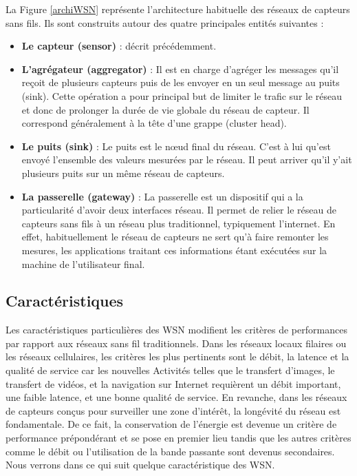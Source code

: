 La  Figure \ref{archiWSN} représente l’architecture habituelle des réseaux de capteurs sans fils. Ils sont construits autour des quatre principales entités suivantes :

\begin{itemize}

\item \textbf{Le capteur (sensor)} : décrit précédemment.

\item \textbf{L’agrégateur (aggregator)} : Il est en charge d’agréger les messages qu’il reçoit de plusieurs capteurs puis de les envoyer en un seul message au puits (sink). Cette opération a pour principal but de limiter le trafic sur le réseau et donc de prolonger la durée de vie globale du réseau de capteur. Il correspond généralement à la tête d’une grappe (cluster head).

\item \textbf{Le puits (sink)} : Le puits est le nœud final  du réseau. C’est à lui qu’est  envoyé l’ensemble des valeurs mesurées par le réseau.  Il peut arriver qu’il y’ait plusieurs puits sur un  même réseau de capteurs.

\item \textbf{La passerelle (gateway)} : La passerelle est un dispositif qui a la particularité d’avoir deux interfaces réseau. Il permet de relier le réseau de capteurs  sans fils  à un réseau plus traditionnel, typiquement l’internet.   
En effet, habituellement  le réseau de capteurs  ne sert  qu’à  faire remonter les 
mesures, les applications traitant ces informations étant exécutées sur la machine 
de l’utilisateur final.

\end{itemize}


\subsection{Caractéristiques}
Les caractéristiques particulières des WSN modifient les critères de performances par rapport aux réseaux sans fil traditionnels. Dans les réseaux locaux filaires ou les réseaux cellulaires, les critères les plus pertinents sont le débit, la latence et la qualité de service car les nouvelles Activités telles que le transfert d’images,  le  transfert de vidéos, et la navigation sur Internet requièrent un débit important, une faible latence, et une bonne qualité de service. En revanche, dans les réseaux de capteurs conçus pour surveiller une zone d’intérêt,  la longévité du réseau est fondamentale. De ce fait, la conservation de l’énergie est devenue un critère de performance prépondérant et se pose en premier lieu tandis que les autres critères comme le débit ou l’utilisation de la bande passante sont devenus secondaires. Nous verrons dans ce qui suit quelque caractéristique des WSN.

